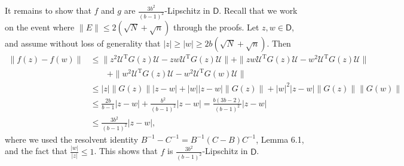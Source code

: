\documentclass[reqno]{amsart}
\newcommand{\T}{\mathrm{T}}
\theoremstyle{plain}
\theoremstyle{definition}
\begin{document}
It remains to show that $f$ and $g$ are $\frac{3b^2}{(b-1)^2}$-Lipschitz in $\mathsf D$.  Recall that we work on the event where $\|E \| \leq 2(\sqrt N+ \sqrt{n})$ through the proofs.  Let $z,w \in \mathsf D$, and assume without loss of generality that $|z| \geq |w| \ge 2b(\sqrt N+ \sqrt{n})$.  Then
\begin{align*}
	\| f(z) - f(w) \| &\leq \|z^2 \mathcal U^\T G(z) \mathcal U - zw \mathcal U^\T G (z) \mathcal U \| + \| zw \mathcal U^\T G(z) \mathcal U - w^2 \mathcal U^\T G(z) \mathcal U \| \\
	&\qquad + \| w^2 \mathcal U^\T G(z) \mathcal U - w^2 \mathcal U^\T G(w) \mathcal U \| \\
	&\leq |z| \|G(z)\| |z - w| + |w| |z-w| \|G(z) \| + |w|^2 |z-w| \|G(z) \| \| G(w) \| \\
	&\leq \frac{2b}{b-1} |z-w| + \frac{b^2}{(b-1)^2}|z-w| = \frac{b(3b-2)}{(b-1)^2}|z-w|\\
	&\leq \frac{3b^2}{(b-1)^2} |z-w|,
\end{align*}
where we used the resolvent identity $B^{-1} - C^{-1} = B^{-1} (C - B) C^{-1} $, Lemma 6.1, and the fact that $\frac{|w|}{|z|} \leq 1$.  This shows that $f$ is $\frac{3b^2}{(b-1)^2}$-Lipschitz in $\mathsf D$.  
\end{document}
